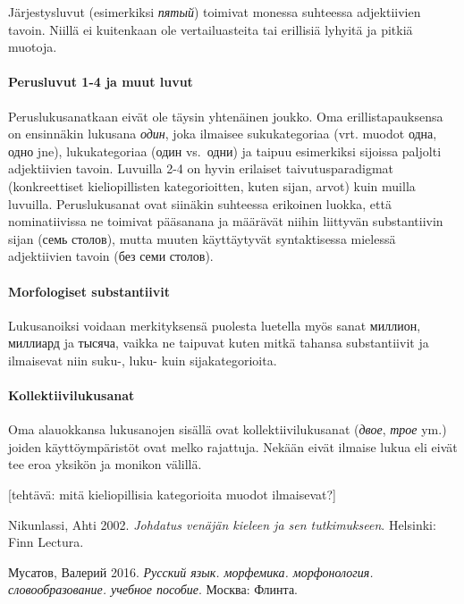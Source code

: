 \documentclass[]{scrartcl}
\begin{document}
Järjestysluvut (esimerkiksi \emph{пятый}) toimivat monessa suhteessa
adjektiivien tavoin. Niillä ei kuitenkaan ole vertailuasteita tai
erillisiä lyhyitä ja pitkiä muotoja.

\paragraph{Perusluvut 1-4 ja muut
luvut}\label{perusluvut-1-4-ja-muut-luvut}

Peruslukusanatkaan eivät ole täysin yhtenäinen joukko. Oma
erillistapauksensa on ensinnäkin lukusana \emph{один}, joka ilmaisee
sukukategoriaa (vrt. muodot одна, одно jne), lukukategoriaa (один
vs.~одни) ja taipuu esimerkiksi sijoissa paljolti adjektiivien tavoin.
Luvuilla 2-4 on hyvin erilaiset taivutusparadigmat (konkreettiset
kieliopillisten kategorioitten, kuten sijan, arvot) kuin muilla
luvuilla. Peruslukusanat ovat siinäkin suhteessa erikoinen luokka, että
nominatiivissa ne toimivat pääsanana ja määrävät niihin liittyvän
substantiivin sijan (семь столов), mutta muuten käyttäytyvät
syntaktisessa mielessä adjektiivien tavoin (без семи столов).

\paragraph{Morfologiset substantiivit}\label{morfologiset-substantiivit}

Lukusanoiksi voidaan merkityksensä puolesta luetella myös sanat миллион,
миллиард ja тысяча, vaikka ne taipuvat kuten mitkä tahansa substantiivit
ja ilmaisevat niin suku-, luku- kuin sijakategorioita.

\paragraph{Kollektiivilukusanat}\label{kollektiivilukusanat}

Oma alauokkansa lukusanojen sisällä ovat kollektiivilukusanat
(\emph{двое}, \emph{трое} ym.) joiden käyttöympäristöt ovat melko
rajattuja. Nekään eivät ilmaise lukua eli eivät tee eroa yksikön ja
monikon välillä.

{[}tehtävä: mitä kieliopillisia kategorioita muodot ilmaisevat?{]}

Nikunlassi, Ahti 2002. \emph{Johdatus venäjän kieleen ja sen
tutkimukseen}. Helsinki: Finn Lectura.

Мусатов, Валерий 2016. \emph{Русский язык. морфемика. морфонология.
словообразование. учебное пособие}. Москва: Флинта.
\end{document}
